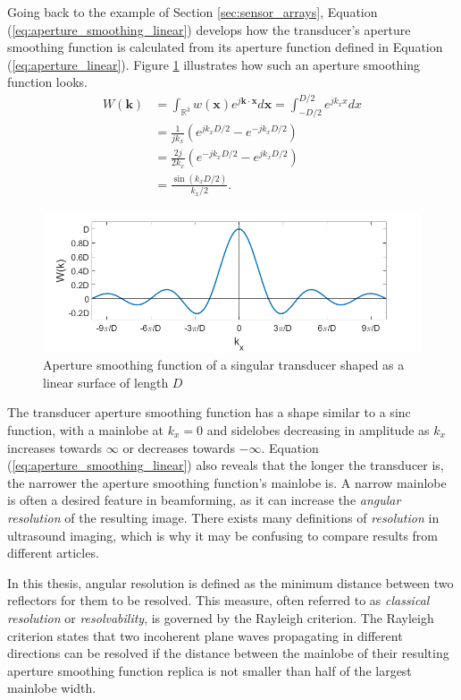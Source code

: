 Going back to the example of Section \ref{sec:sensor_arrays}, Equation (\ref{eq:aperture_smoothing_linear}) develops how the transducer's aperture smoothing function is calculated from its aperture function defined in Equation (\ref{eq:aperture_linear}). Figure \ref{fig:linarray} illustrates how such an aperture smoothing function looks.
\begin{align}
    W(\boldsymbol{k}) &= \int_{\mathbb{R}^3} w(\boldsymbol{x}) e^{j \boldsymbol{k} \cdot \boldsymbol{x}} d\boldsymbol{x} = \int_{-D/2}^{D/2} e^{j k_x x} dx \nonumber \\
    &= \frac{1}{j k_x} (e^{j k_x D/2} - e^{-j k_x D/2}) \nonumber \\
    &= \frac{2j}{2k_x} (e^{-j k_x D/2} - e^{j k_x D/2}) \nonumber \\
    &= \frac{\sin(k_x D/2)}{k_x/2}.
\label{eq:aperture_smoothing_linear}
\end{align}

\begin{figure}[ht]
    \includegraphics[width=\linewidth]{./images/background/aperture_smoothing_function.png}
	\caption{Aperture smoothing function of a singular transducer shaped as a linear surface of length $D$}
	\label{fig:linarray}
\end{figure}
\noindent
The transducer aperture smoothing function has a shape similar to a sinc function, with a mainlobe at $k_x = 0$ and sidelobes decreasing in amplitude as $k_x$ increases towards $\infty$ or decreases towards $-\infty$. Equation (\ref{eq:aperture_smoothing_linear}) also reveals that the longer the transducer is, the narrower the aperture smoothing function's mainlobe is. A narrow mainlobe is often a desired feature in beamforming, as it can increase the \textit{angular resolution} of the resulting image. There exists many definitions of \textit{resolution} in ultrasound imaging, which is why it may be confusing to compare results from different articles.

In this thesis, angular resolution is defined as the minimum distance between two reflectors for them to be resolved. This measure, often referred to as \textit{classical resolution} or \textit{resolvability}, is governed by the Rayleigh criterion. The Rayleigh criterion states that two incoherent plane waves propagating in different directions can be resolved if the distance between the mainlobe of their resulting aperture smoothing function replica is not smaller than half of the largest mainlobe width.

